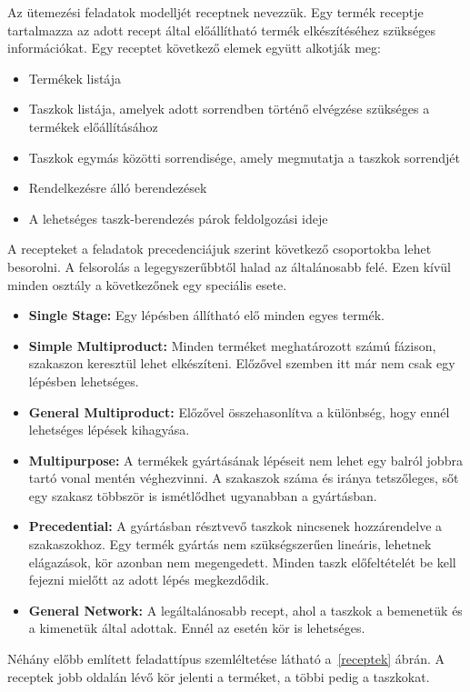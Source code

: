 Az ütemezési feladatok modelljét receptnek nevezzük. Egy termék receptje tartalmazza az adott recept által előállítható termék elkészítéséhez szükséges információkat\cite{Hegyhati}. Egy receptet következő elemek együtt alkotják meg:
\begin{itemize}
  \item Termékek listája
  \item Taszkok listája, amelyek adott sorrendben történő elvégzése szükséges a termékek előállításához
  \item Taszkok egymás közötti sorrendisége, amely megmutatja a taszkok sorrendjét
  \item Rendelkezésre álló berendezések
  \item A lehetséges taszk-berendezés párok feldolgozási ideje
\end{itemize}
A recepteket a feladatok precedenciájuk szerint következő csoportokba lehet besorolni. A felsorolás a legegyszerűbbtől halad az általánosabb felé. Ezen kívül minden osztály a következőnek egy speciális esete.
\begin{itemize}
	\item \textbf{Single Stage:} Egy lépésben állítható elő minden egyes termék.
	\item \textbf{Simple Multiproduct:} Minden terméket meghatározott számú fázison, szakaszon keresztül lehet elkészíteni. Előzővel szemben itt már nem csak egy lépésben lehetséges.
	\item \textbf{General Multiproduct:} Előzővel összehasonlítva a különbség, hogy ennél lehetséges lépések kihagyása.
	\item \textbf{Multipurpose:} A termékek gyártásának lépéseit nem lehet egy balról jobbra tartó vonal mentén véghezvinni. A szakaszok száma és iránya tetszőleges, sőt egy szakasz többször is ismétlődhet ugyanabban a gyártásban.
	\item \textbf{Precedential:} A gyártásban résztvevő taszkok nincsenek hozzárendelve a szakaszokhoz. Egy termék gyártás nem szükségszerűen lineáris, lehetnek elágazások, kör azonban nem megengedett. Minden taszk előfeltételét be kell fejezni mielőtt az adott lépés megkezdődik. 
	\item \textbf{General Network:} A legáltalánosabb recept, ahol a taszkok a bemenetük és a kimenetük által adottak. Ennél az esetén kör is lehetséges.
\end{itemize}
Néhány előbb említett feladattípus szemléltetése látható a~\ref{receptek} ábrán. A receptek jobb oldalán lévő kör jelenti a terméket, a többi pedig a taszkokat.
